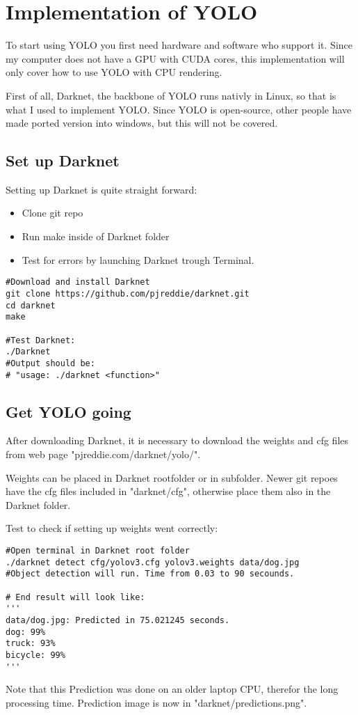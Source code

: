 \newpage

\section{Implementation of YOLO}
To start using YOLO you first need hardware and software who support it. Since my computer does not have a GPU with CUDA cores, this implementation will only cover how to use YOLO with CPU rendering. 

First of all, Darknet, the backbone of YOLO runs nativly in Linux, so that is what I used to implement YOLO. Since YOLO is open-source, other people have made ported version into windows, but this will not be covered.

\subsection{Set up Darknet}

Setting up Darknet is quite straight forward:
\begin{itemize}  
\item Clone git repo
\item Run make inside of Darknet folder
\item Test for errors by launching Darknet trough Terminal.  
\end{itemize}

\lstset{language=Python}
\begin{lstlisting}[frame=single]  
#Download and install Darknet
git clone https://github.com/pjreddie/darknet.git
cd darknet
make

#Test Darknet:
./Darknet
#Output should be:
# "usage: ./darknet <function>"
\end{lstlisting}


\subsection{Get YOLO going}\label{getYOLOgoing}
After downloading Darknet, it is necessary to download the weights and cfg files from web page "pjreddie.com/darknet/yolo/".

Weights can be placed in Darknet rootfolder or in subfolder. Newer git repoes have the cfg files included in "darknet/cfg", otherwise place them also in the Darknet folder.

Test to check if setting up weights went correctly:
\begin{lstlisting}[frame=single]  
#Open terminal in Darknet root folder
./darknet detect cfg/yolov3.cfg yolov3.weights data/dog.jpg
#Object detection will run. Time from 0.03 to 90 secounds.

# End result will look like:
'''
data/dog.jpg: Predicted in 75.021245 seconds.
dog: 99%
truck: 93%
bicycle: 99%
'''
\end{lstlisting}
Note that this Prediction was done on an older laptop CPU, therefor the long processing time. 
Prediction image is now in "darknet/predictions.png".

